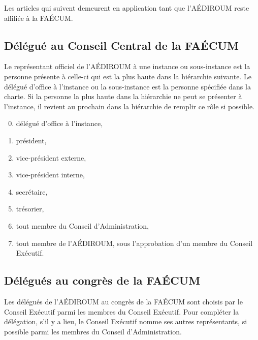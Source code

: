 \documentclass{aediroum}
\begin{document}
Les articles qui suivent demeurent en application tant que l'AÉDIROUM reste affiliée à la FAÉCUM.

\subsection{Délégué au Conseil Central de la FAÉCUM}\label{sec:delegue-conseil-central}

Le représentant officiel de l'AÉDIROUM à une instance ou sous-instance est la personne présente à celle-ci qui est la plus haute dans la hiérarchie suivante. Le délégué d'office à l'instance ou la sous-instance est la personne spécifiée dans la charte. Si la personne la plus haute dans la hiérarchie ne peut se présenter à l'instance, il revient au prochain dans la hiérarchie de remplir ce rôle si possible.
\begin{enumerate}\setcounter{enumi}{-1}
\item délégué d'office à l'instance,
\item président,
\item vice-président externe,
\item vice-président interne,
\item secrétaire,
\item trésorier,
\item tout membre du Conseil d'Administration,
\item tout membre de l'AÉDIROUM, sous l'approbation d'un membre du Conseil Exécutif.
\end{enumerate}

\subsection{Délégués au congrès de la FAÉCUM}\label{sec:delegues-congres}
Les délégués de l'AÉDIROUM au congrès de la FAÉCUM sont choisis par le Conseil Exécutif parmi les membres du Conseil Exécutif. Pour compléter la délégation, s'il y a lieu, le Conseil Exécutif nomme ses autres représentants, si possible parmi les membres du Conseil d'Administration.
\end{document}
